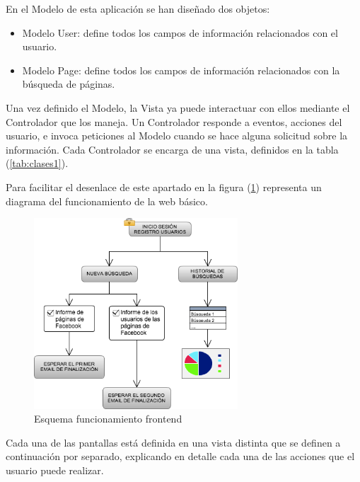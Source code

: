 En el Modelo de esta aplicación se han diseñado dos objetos: 
\begin{itemize} \itemsep4pt \parskip0pt
\item Modelo User: define todos los campos de información relacionados con el usuario.  
\item Modelo Page: define todos los campos de información relacionados con la búsqueda de páginas.
\end{itemize}
Una vez definido el Modelo, la Vista ya puede interactuar con ellos mediante el Controlador que los maneja. 
Un Controlador responde a eventos, acciones del usuario, e invoca peticiones al Modelo cuando se hace alguna solicitud sobre la información. Cada Controlador se encarga de una vista, definidos en la tabla (\ref{tab:clases1}). 

Para facilitar el desenlace de este apartado en la figura (\ref{fig:web}) representa un diagrama del funcionamiento de la web básico.
\begin{figure}[H]
\centering
\includegraphics[width=3in]{figuras/appWeb.png}
\caption{Esquema funcionamiento frontend} \label{fig:web}
\end{figure}
Cada una de las pantallas está definida en una vista distinta que se definen a continuación por separado, explicando en detalle cada una de las acciones que el usuario puede realizar. 

